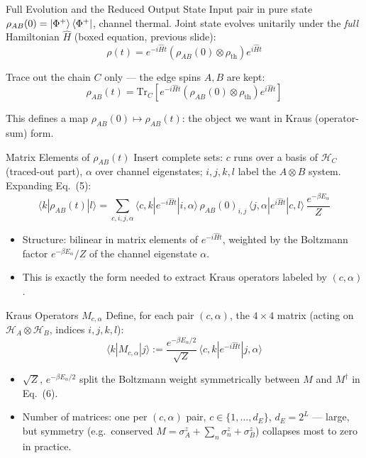\documentclass[11pt]{beamer}
\renewcommand{\Tr}{\mathrm{Tr}}
\newcommand{\sigz}{\sigma^z}
\begin{document}
\begin{frame}{Full Evolution and the Reduced Output State}
Input pair in pure state $\rho_{AB}(0)=\ket{\Phi^+}\bra{\Phi^+}$, channel thermal. Joint state evolves unitarily under the \emph{full} Hamiltonian $\hat H$ (boxed equation, previous slide):
\[
\rho(t) = e^{-i\hat H t}\left(\rho_{AB}(0)\otimes\rho_{\text{th}}\right)e^{i\hat H t} \tag{4}
\]

Trace out the chain $C$ only — the edge spins $A,B$ are kept:
\[
\rho_{AB}(t) = \Tr_{C}\!\left[e^{-i\hat H t}\left(\rho_{AB}(0)\otimes\rho_{\text{th}}\right)e^{i\hat H t}\right] \tag{5}
\]

\vspace{4pt}
This defines a map $\rho_{AB}(0) \mapsto \rho_{AB}(t)$: the object we want in Kraus (operator-sum) form.
\end{frame}

\begin{frame}{Matrix Elements of $\rho_{AB}(t)$}
Insert complete sets: $c$ runs over a basis of $\mathcal{H}_C$ (traced-out part), $\alpha$ over channel eigenstates; $i,j,k,l$ label the $A\otimes B$ system. Expanding Eq.\ (5):
\[
\langle k|\rho_{AB}(t)|l\rangle
= \sum_{c,i,j,\alpha} \langle c,k|e^{-i\hat H t}|i,\alpha\rangle\, \rho_{AB}(0)_{i,j} \,\langle j,\alpha|e^{i\hat H t}|c,l\rangle\, \frac{e^{-\beta E_\alpha}}{Z} \tag{6}
\]

\vspace{4pt}
\begin{itemize}
\item Structure: bilinear in matrix elements of $e^{-i\hat H t}$, weighted by the Boltzmann factor $e^{-\beta E_\alpha}/Z$ of the channel eigenstate $\alpha$.
\item This is exactly the form needed to extract Kraus operators labeled by $(c,\alpha)$.
\end{itemize}
\end{frame}

\begin{frame}{Kraus Operators $M_{c,\alpha}$}
Define, for each pair $(c,\alpha)$, the $4\times4$ matrix (acting on $\mathcal{H}_A\otimes\mathcal{H}_B$, indices $i,j,k,l$):
\[
\langle k|M_{c,\alpha}|j\rangle := \frac{e^{-\beta E_\alpha/2}}{\sqrt{Z}}\, \langle c,k|e^{-i\hat H t}|j,\alpha\rangle \tag{7}
\]

\begin{itemize}
\item $\sqrt{Z}$, $e^{-\beta E_\alpha/2}$ split the Boltzmann weight symmetrically between $M$ and $M^\dagger$ in Eq.\ (6).
\item Number of matrices: one per $(c,\alpha)$ pair, $c\in\{1,\dots,d_E\}$, $d_E=2^L$ — large, but symmetry (e.g.\ conserved $M=\sigz_A+\sum_n\sigz_n+\sigz_B$) collapses most to zero in practice.
\end{itemize}
\end{frame}
\end{document}
